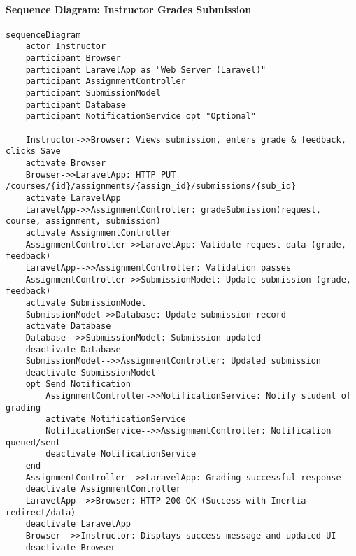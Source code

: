 \paragraph*{Sequence Diagram: Instructor Grades Submission}
\begin{verbatim}
sequenceDiagram
    actor Instructor
    participant Browser
    participant LaravelApp as "Web Server (Laravel)"
    participant AssignmentController
    participant SubmissionModel
    participant Database
    participant NotificationService opt "Optional"

    Instructor->>Browser: Views submission, enters grade & feedback, clicks Save
    activate Browser
    Browser->>LaravelApp: HTTP PUT /courses/{id}/assignments/{assign_id}/submissions/{sub_id}
    activate LaravelApp
    LaravelApp->>AssignmentController: gradeSubmission(request, course, assignment, submission)
    activate AssignmentController
    AssignmentController->>LaravelApp: Validate request data (grade, feedback)
    LaravelApp-->>AssignmentController: Validation passes
    AssignmentController->>SubmissionModel: Update submission (grade, feedback)
    activate SubmissionModel
    SubmissionModel->>Database: Update submission record
    activate Database
    Database-->>SubmissionModel: Submission updated
    deactivate Database
    SubmissionModel-->>AssignmentController: Updated submission
    deactivate SubmissionModel
    opt Send Notification
        AssignmentController->>NotificationService: Notify student of grading
        activate NotificationService
        NotificationService-->>AssignmentController: Notification queued/sent
        deactivate NotificationService
    end
    AssignmentController-->>LaravelApp: Grading successful response
    deactivate AssignmentController
    LaravelApp-->>Browser: HTTP 200 OK (Success with Inertia redirect/data)
    deactivate LaravelApp
    Browser-->>Instructor: Displays success message and updated UI
    deactivate Browser
\end{verbatim}

